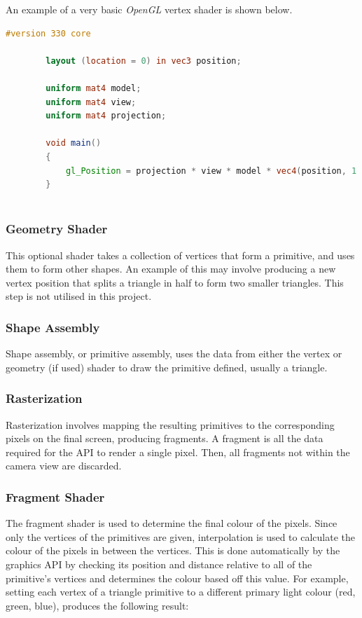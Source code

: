 \documentclass[a4paper, 12pt]{article}
\begin{document}
    An example of a very basic \textit{OpenGL} vertex shader is shown below.

    \begin{lstlisting}[language=glsl]
        #version 330 core

        layout (location = 0) in vec3 position;

        uniform mat4 model;
        uniform mat4 view;
        uniform mat4 projection;

        void main()
        {
            gl_Position = projection * view * model * vec4(position, 1.0);
        }
        
    \end{lstlisting}

    \subsubsection{Geometry Shader}

    This optional shader takes a collection of vertices that form a primitive, and uses them to form other shapes. An example of this may involve producing a new vertex position that splits a triangle in half to form two smaller triangles. This step is not utilised in this project.

    \subsubsection{Shape Assembly}

    Shape assembly, or primitive assembly, uses the data from either the vertex or geometry (if used) shader to draw the primitive defined, usually a triangle.

    \subsubsection{Rasterization}

    Rasterization involves mapping the resulting primitives to the corresponding pixels on the final screen, producing fragments. A fragment is all the data required for the API to render a single pixel. Then, all fragments not within the camera view are discarded.

    \subsubsection{Fragment Shader}

    The fragment shader is used to determine the final colour of the pixels. Since only the vertices of the primitives are given, interpolation is used to calculate the colour of the pixels in between the vertices. This is done automatically by the graphics API by checking its position and distance relative to all of the primitive's vertices and determines the colour based off this value. For example, setting each vertex of a triangle primitive to a different primary light colour (red, green, blue), produces the following result:
\end{document}
